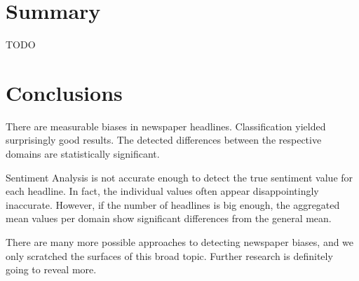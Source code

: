 \documentclass[final]{ieee}
\begin{document}
\section{Summary}
TODO

\section{Conclusions}
There are measurable biases in newspaper headlines. Classification yielded surprisingly good results. The detected differences between the respective domains are statistically significant.

Sentiment Analysis is not accurate enough to detect the true sentiment value for each headline. In fact, the individual values often appear disappointingly inaccurate. However, if the number of headlines is big enough, the aggregated mean values per domain show significant differences from the general mean.

There are many more possible approaches to detecting newspaper biases, and we only scratched the surfaces of this broad topic. Further research is definitely going to reveal more. %



           




  
    
  
\end{document}
